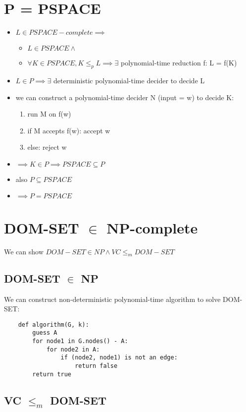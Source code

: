 \documentclass{article}
\begin{document}
\section{P = PSPACE}
\begin{itemize}
	\item $ L \in PSPACE-complete \implies $
	\begin{itemize}
		\item $ L \in PSPACE \land $
		\item $ \forall K \in PSPACE, K \leq_p L \implies \exists $ 
		polynomial-time reduction f: L = f(K)
	\end{itemize}
	\item $ L \in P \implies \exists $ deterministic polynomial-time decider to 
	decide L
	\item we can construct a polynomial-time decider N (input = w) to decide K:
	\begin{enumerate}
		\item run M on f(w)
		\item if M accepts f(w): accept w
		\item else: reject w
	\end{enumerate}
	\item $ \implies K \in P \implies PSPACE \subseteq P $
	\item also $ P \subseteq PSPACE $
	\item $ \implies P = PSPACE $
\end{itemize}

\section{DOM-SET $ \in $ NP-complete}

We can show $ DOM-SET \in NP \land VC \leq_m DOM-SET $

\subsection{DOM-SET $ \in $ NP}
We can construct non-deterministic polynomial-time algorithm to solve DOM-SET:
\begin{lstlisting}
	def algorithm(G, k):
		guess A
		for node1 in G.nodes() - A:
			for node2 in A:
				if (node2, node1) is not an edge:
					return false
		return true
\end{lstlisting}

\subsection{VC $ \leq_m $ DOM-SET}
\end{document}
